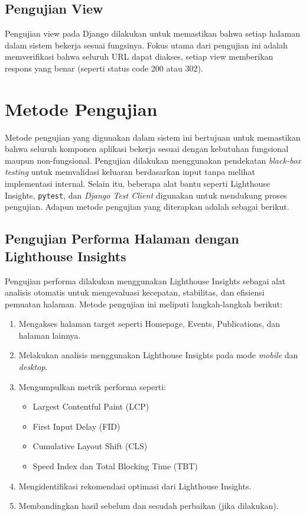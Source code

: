 \subsection{Pengujian View}
Pengujian view pada Django dilakukan untuk memastikan bahwa setiap halaman dalam sistem bekerja sesuai fungsinya. Fokus utama dari pengujian ini adalah memverifikasi bahwa seluruh URL dapat diakses, setiap view memberikan respons yang benar (seperti status code 200 atau 302).

\section{Metode Pengujian}

Metode pengujian yang digunakan dalam sistem ini bertujuan untuk memastikan bahwa seluruh komponen aplikasi bekerja sesuai dengan kebutuhan fungsional maupun non-fungsional. Pengujian dilakukan menggunakan pendekatan \textit{black-box testing} untuk memvalidasi keluaran berdasarkan input tanpa melihat implementasi internal. Selain itu, beberapa alat bantu seperti Lighthouse Insights, \texttt{pytest}, dan \textit{Django Test Client} digunakan untuk mendukung proses pengujian. Adapun metode pengujian yang diterapkan adalah sebagai berikut.

\subsection{Pengujian Performa Halaman dengan Lighthouse Insights}

Pengujian performa dilakukan menggunakan Lighthouse Insights sebagai alat analisis otomatis untuk mengevaluasi kecepatan, stabilitas, dan efisiensi pemuatan halaman. Metode pengujian ini meliputi langkah-langkah berikut:

\begin{enumerate}
    \item Mengakses halaman target seperti Homepage, Events, Publications, dan halaman lainnya.
    \item Melakukan analisis menggunakan Lighthouse Insights pada mode \textit{mobile} dan \textit{desktop}.
    \item Mengumpulkan metrik performa seperti:
    \begin{itemize}
        \item Largest Contentful Paint (LCP)
        \item First Input Delay (FID)
        \item Cumulative Layout Shift (CLS)
        \item Speed Index dan Total Blocking Time (TBT)
    \end{itemize}
    \item Mengidentifikasi rekomendasi optimasi dari Lighthouse Insights.
    \item Membandingkan hasil sebelum dan sesudah perbaikan (jika dilakukan).
\end{enumerate}

